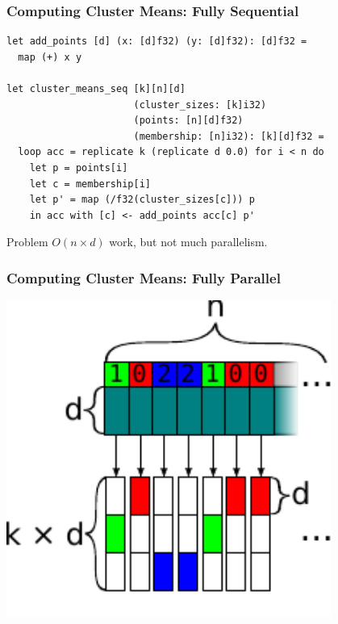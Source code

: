 \documentclass[rgb,dvipsnames]{beamer}
\begin{document}
\begin{frame}[fragile]
  \frametitle{Computing Cluster Means: Fully Sequential}

\begin{lstlisting}
let add_points [d] (x: [d]f32) (y: [d]f32): [d]f32 =
  map (+) x y

let cluster_means_seq [k][n][d]
                      (cluster_sizes: [k]i32)
                      (points: [n][d]f32)
                      (membership: [n]i32): [k][d]f32 =
  loop acc = replicate k (replicate d 0.0) for i < n do
    let p = points[i]
    let c = membership[i]
    let p' = map (/f32(cluster_sizes[c])) p
    in acc with [c] <- add_points acc[c] p'
\end{lstlisting}
\pause
  \begin{block}{Problem}
    $O(n\times{}d)$ work, but not much parallelism.
  \end{block}

\end{frame}

\begin{frame}[fragile]
  \frametitle{Computing Cluster Means: Fully Parallel}

  \begin{center}
\includegraphics[width=0.8\textwidth]{img/cluster_means_par_0.pdf}
\end{center}
\end{frame}
\end{document}
